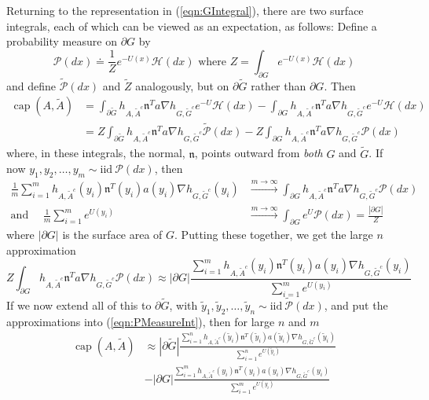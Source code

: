 \documentclass[nofootinbib,english, aip, jcp, priprint, graphicx,floatfix]{revtex4-1}
\theoremstyle{plain}
\theoremstyle{definition}
\theoremstyle{plain}
\newcommand{\normal}{{\mathfrak{n}}}
\newcommand{\capac}[2]{\ensuremath{\operatorname{cap}}(#1,#2)}
\newcommand{\hausdorffmeasure}{\mathscr{H}(dx)}
\newcommand{\PMeasure}{\mathscr{P}(dx)}
\newcommand{\tPMeasure}{\tilde{\mathscr P}(dx)}
\begin{document}
Returning to the representation in (\ref{eqn:GIntegral}), there are two surface integrals, each of which can be viewed as an expectation, as follows: Define a probability measure on
$\partial G$ by
\[
\PMeasure\doteq\frac{1}{Z}e^{-U(x)}\hausdorffmeasure 
\text{   where   }
Z= \int_{\partial G} e^{-U(x)}\hausdorffmeasure
\]
and define $\tPMeasure$
and $\tilde{Z}$ analogously, but on $\partial\tilde{G}$ rather than $\partial G$.
Then
\begin{align}
\capac{A}{\tilde A} & = \int_{\partial\tilde{G}} h_{A, \tilde{A}^c}    \normal^T a  \nabla h_{G, \tilde{G}^c} e^{- U } \hausdorffmeasure
-\int_{\partial G} h_{A, \tilde{A}^c}    \normal^T a  \nabla h_{G, \tilde{G}^c} e^{- U } \hausdorffmeasure
\nonumber \\
&=Z
\int_{\partial\tilde{G}} h_{A, \tilde{A}^c}    \normal^T a  \nabla h_{G, \tilde{G}^c} \tPMeasure
-Z
\int_{\partial G} h_{A, \tilde{A}^c}    \normal^T a  
\nabla h_{G,\tilde{G}^c} \PMeasure
\label{eqn:PMeasureInt}
\end{align}
where, in these integrals, the normal, $\normal$, points outward from {\em both} $G$ and $\tilde G$.
If now $y_1,y_2,\dots,y_m\sim \text{iid}\ \PMeasure$, then 
\begin{align*}
\frac{1}{m}\sum_{i=1}^m 
h_{A, \tilde{A}^c}(y_i) \normal^T(y_i) a(y_i)  \nabla h_{G,\tilde{G}^c}(y_i) & \stackrel{m\to\infty}{\longrightarrow}
 \int_{\partial G} h_{A, \tilde{A}^c}    \normal^T a  
\nabla h_{G,\tilde{G}^c} \PMeasure \\
\text{and}\ \ \ \ \ \ \frac{1}{m}\sum_{i=1}^m e^{U(y_i)}
& \stackrel{m\to\infty}{\longrightarrow} \int_{\partial G} e^U
\PMeasure = \frac{|\partial G|}{Z}
\end{align*}
where $|\partial G|$ is the surface area of $G$. Putting these together, we get the large $n$ approximation
\[
Z
\int_{\partial G} h_{A, \tilde{A}^c}    \normal^T a  
\nabla h_{G,\tilde{G}^c} \PMeasure
\approx
|\partial G|
\frac{\sum_{i=1}^m 
h_{A, \tilde{A}^c}(y_i) \normal^T(y_i) a(y_i)  \nabla h_{G,\tilde{G}^c}(y_i)}
{\sum_{i=1}^m e^{U(y_i)}}
\]
If we now extend all of this to $\partial\tilde{G}$, with 
$\tilde{y}_1,\tilde{y}_2,\dots,\tilde{y}_n\sim \text{iid}\ \tPMeasure$, and put the approximations into 
(\ref{eqn:PMeasureInt}), then for large $n$ and $m$
\begin{align}
\capac{A}{\tilde A} & \approx
|\partial\tilde{G}|
\frac{\sum_{i=1}^n 
h_{A, \tilde{A}^c}(\tilde{y}_i) \normal^T(\tilde{y}_i) a(\tilde{y}_i)  \nabla h_{G,\tilde{G}^c}(\tilde{y}_i)}
{\sum_{i=1}^n e^{U(\tilde{y}_i)}}
\label{eqn:approximate_capacity}\\
& -|\partial G|
\frac{\sum_{i=1}^m 
h_{A, \tilde{A}^c}(y_i) \normal^T(y_i) a(y_i)  \nabla h_{G,\tilde{G}^c}(y_i)}
{\sum_{i=1}^m e^{U(y_i)}}
\nonumber
\end{align}
\end{document}
